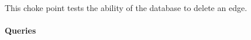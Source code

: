 
This choke point tests the ability of the database to delete an edge.


\paragraph{Queries}
{\raggedright

}